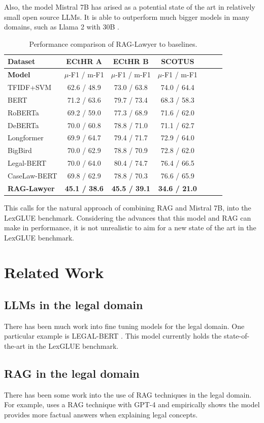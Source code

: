 \documentclass[11pt]{article}
\begin{document}
Also, the model Mistral 7B \cite{jiang2023mistral} has arised as a potential state of the art in relatively small open source LLMs. It is able to outperform much bigger models in many domains, such as Llama 2 with 30B \cite{touvron2023llama}.

\begin{table}[t]
\centering
\begin{tabular}{l|c|c|c|c|c|c}
  \textbf{Dataset} & \textbf{ECtHR A} & \textbf{ECtHR B} & \textbf{SCOTUS} \\
\hline
\textbf{Model} & \(\mu\)-F1 / m-F1 & \(\mu\)-F1 / m-F1 & \(\mu\)-F1 / m-F1 \\
\hline
TFIDF+SVM & 62.6 / 48.9 & 73.0 / 63.8 & 74.0 / 64.4 \\
BERT & 71.2 / 63.6 & 79.7 / 73.4 & 68.3 / 58.3 \\
RoBERTa & 69.2 / 59.0 & 77.3 / 68.9 & 71.6 / 62.0 \\
DeBERTa & 70.0 / 60.8 & 78.8 / 71.0 & 71.1 / 62.7 \\
Longformer & 69.9 / 64.7 & 79.4 / 71.7 & 72.9 / 64.0 \\
BigBird & 70.0 / 62.9 & 78.8 / 70.9 & 72.8 / 62.0 \\
Legal-BERT & 70.0 / 64.0 & 80.4 / 74.7 & 76.4 / 66.5 \\
CaseLaw-BERT & 69.8 / 62.9 & 78.8 / 70.3 & 76.6 / 65.9 \\
  \textbf{RAG-Lawyer} & \textbf{45.1 / 38.6} & \textbf{45.5 / 39.1} & \textbf{34.6 / 21.0}\\
\hline
\end{tabular}
\caption{Performance comparison of RAG-Lawyer to baselines.}
\end{table}
This calls for the natural approach of combining RAG and Mistral 7B, into the LexGLUE benchmark. Considering the advances that this model and RAG can make in performance, it is not unrealistic to aim for a new state of the art in the LexGLUE benchmark.
\section{Related Work}
\subsection{LLMs in the legal domain}
There has been much work into fine tuning models for the legal domain. One particular example is LEGAL-BERT  \cite{chalkidis2020legal}. This model currently holds the state-of-the-art in the LexGLUE benchmark.
\subsection{RAG in the legal domain}
There has been some work into the use of RAG techniques in the legal domain. For example, \cite{savelka2023explaining} uses a RAG technique with GPT-4 and empirically shows the model provides more factual answers when explaining legal concepts.
\end{document}
